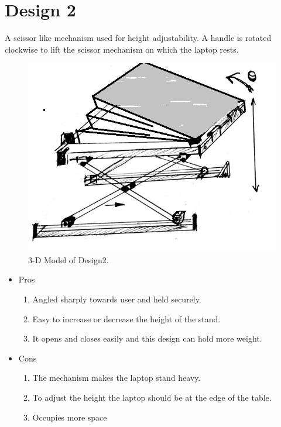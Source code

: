 \section{Design 2}

A scissor like mechanism used for height adjustability. A handle is rotated clockwise to lift the scissor mechanism on which the laptop rests\cite{american_manf}.

\begin{figure}
  \includegraphics[width=\linewidth]{design2}
  \caption{3-D Model of Design2.}
  \label{fig:Design2}
\end{figure}

\begin{itemize}
 \item Pros
 \begin{enumerate}
	\item Angled sharply towards user and held securely.
    \item Easy to increase or decrease the height of the stand.
    \item It opens and closes easily and this design can hold more weight.
 \end{enumerate}
 \newpage
 \item Cons
 \begin{enumerate}
	\item The mechanism makes the laptop stand heavy.
    \item To adjust the height the laptop should be at the edge of the table.
    \item Occupies more space
 \end{enumerate}
\end{itemize}

